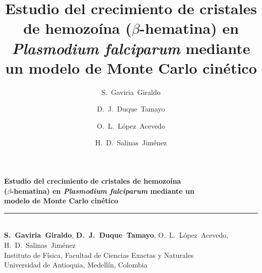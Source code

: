 \documentclass[aspectratio=169,11pt]{beamer}
\title[kMC para hemozoína]{Estudio del crecimiento de cristales de hemozoína
  ($\beta$-hematina) en \textit{Plasmodium falciparum} mediante un modelo de
  Monte Carlo cinético}
\author{S.~Gaviria~Giraldo \and D.~J.~Duque~Tamayo \and O.~L.~López~Acevedo \and H.~D.~Salinas~Jiménez}
\institute{Instituto de Física, Universidad de Antioquia}
\begin{document}
\begin{frame}
  \vspace{0.1cm}
  \begin{center}
    {\Large\bfseries\color{FisicaAzulOscuro} Estudio del crecimiento de cristales de hemozoína\\[0.15em]
    ($\beta$-hematina) en \textit{Plasmodium falciparum} mediante un\\[0.15em]
    modelo de Monte Carlo cinético}\\[0.25cm]
    {\color{FisicaCyan}\rule{0.45\linewidth}{1.2pt}}\\[0.35cm]
    
    {\normalsize \textbf{S.~Gaviria~Giraldo},\; \textbf{D.~J.~Duque~Tamayo},\; O.~L.~López~Acevedo,\; H.~D.~Salinas~Jiménez}\\[0.25cm]
    {\footnotesize\color{TextoPrincipal!80} Instituto de Física, Facultad de Ciencias Exactas y Naturales\\
     Universidad de Antioquia, Medellín, Colombia}\\[0.35cm]

  \end{center}
\end{frame}
\end{document}
